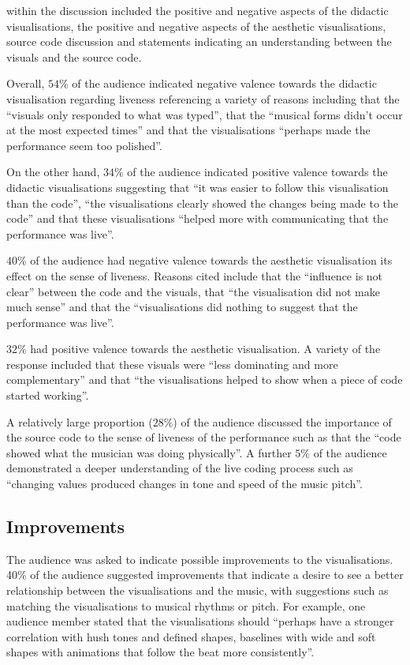 within the discussion included the positive and negative aspects of the didactic visualisations, the positive and negative aspects of the aesthetic visualisations, source code discussion and statements indicating an understanding between the visuals and the source code.

Overall, $54\%$ of the audience indicated negative valence towards the didactic visualisation regarding liveness referencing a variety of reasons including that the ``visuals only responded to what was typed'', that the ``musical forms didn't occur at the most expected times'' and that the visualisations ``perhaps made the performance seem too polished''.

On the other hand, $34\%$ of the audience indicated positive valence towards the didactic visualisations suggesting that ``it was easier to follow this visualisation than the code'', ``the visualisations clearly showed the changes being made to the code'' and that these visualisations ``helped more with communicating that the performance was live''.

$40\%$ of the audience had negative valence towards the aesthetic visualisation its effect on the sense of liveness. Reasons cited include that the ``influence is not clear'' between the code and the visuals, that ``the visualisation did not make much sense'' and that the ``visualisations did nothing to suggest that the performance was live''.

$32\%$ had positive valence towards the aesthetic visualisation. A variety of the response included that these visuals were ``less dominating and more complementary'' and that ``the visualisations helped to show when a piece of code started working''.

A relatively large proportion ($28\%$) of the audience discussed the importance of the source code to the sense of liveness of the performance such as that the ``code showed what the musician was doing physically''. A further $5\%$ of the audience demonstrated a deeper understanding of the live coding process such as ``changing values produced changes in tone and speed of the music pitch''.

\subsection{Improvements}

The audience was asked to indicate possible improvements to the visualisations. 40\% of the audience suggested improvements that indicate a desire to see a better relationship between the visualisations and the music, with suggestions such as matching the visualisations to musical rhythms or pitch. For example, one audience member stated that the visualisations should ``perhaps have a stronger correlation with hush tones and defined shapes, baselines with wide and soft shapes with animations that follow the beat more consistently''.

